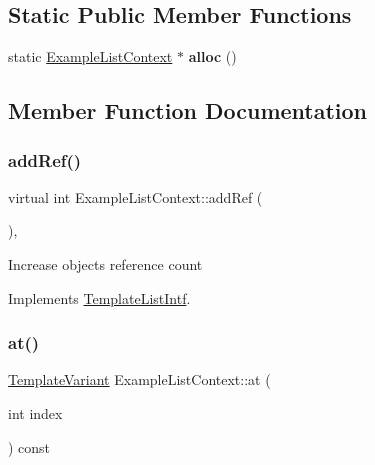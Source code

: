 \subsection*{Static Public Member Functions}
\begin{DoxyCompactItemize}
\item 
\mbox{\label{class_example_list_context_a15672c7c4e0a1ecf0e2c699bf32ab4df}} 
static \mbox{\hyperlink{class_example_list_context}{Example\+List\+Context}} $\ast$ {\bfseries alloc} ()
\end{DoxyCompactItemize}


\subsection{Member Function Documentation}
\mbox{\label{class_example_list_context_a94636ca4704e815f35339998fba5940b}} 
\subsubsection{\texorpdfstring{addRef()}{addRef()}}
{\footnotesize\ttfamily virtual int Example\+List\+Context\+::add\+Ref (\begin{DoxyParamCaption}{ }\end{DoxyParamCaption})\hspace{0.3cm}{\ttfamily [inline]}, {\ttfamily [virtual]}}

Increase object\textquotesingle{}s reference count 

Implements \mbox{\hyperlink{class_template_list_intf_a4b4973e2e15396d10bc4e3085462ca2b}{Template\+List\+Intf}}.

\mbox{\label{class_example_list_context_ac661f44438dbb4b2b36ad219c9da6feb}} 
\subsubsection{\texorpdfstring{at()}{at()}}
{\footnotesize\ttfamily \mbox{\hyperlink{class_template_variant}{Template\+Variant}} Example\+List\+Context\+::at (\begin{DoxyParamCaption}\item[{int}]{index }\end{DoxyParamCaption}) const\hspace{0.3cm}{\ttfamily [virtual]}}

